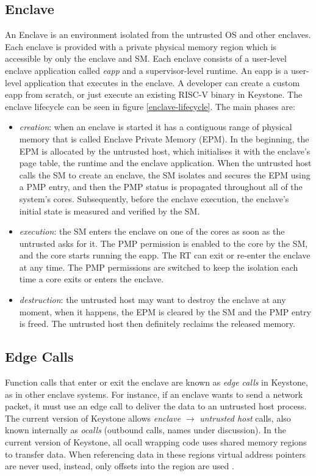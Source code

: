 \subsection{Enclave}
An Enclave is an environment isolated from the untrusted OS and other enclaves. Each enclave is provided with a private physical memory region which is accessible by only the enclave and SM. Each enclave consists of a user-level enclave application called \textit{eapp} and a supervisor-level runtime. An eapp is a user-level application that executes in the enclave. A developer can create a custom eapp from scratch, or just execute an existing RISC-V binary in Keystone. The enclave lifecycle can be seen in figure \ref{enclave-lifecycle}. The main phases are:
\begin{itemize}
    \item \textit{creation}: when an enclave is started it has a contiguous range of physical memory that is called Enclave Private Memory (EPM). In the beginning, the EPM is allocated by the untrusted host, which initialises it with the enclave's page table, the runtime and the enclave application. When the untrusted host calls the SM to create an enclave, the SM isolates and secures the EPM using a PMP entry, and then the PMP status is propagated throughout all of the system's cores. Subsequently, before the enclave execution, the enclave's initial state is measured and verified by the SM.
    \item \textit{execution}: the SM enters the enclave on one of the cores as soon as the untrusted asks for it. The PMP permission is enabled to the core by the SM, and the core starts running the eapp. The RT can exit or re-enter the enclave at any time. The PMP permissions are switched to keep the isolation each time a core exits or enters the enclave.
    \item \textit{destruction}: the untrusted host may want to destroy the enclave at any moment, when it happens, the EPM is cleared by the SM and the PMP entry is freed. The untrusted host then definitely reclaims the released memory.
\end{itemize}

\subsection{Edge Calls}
Function calls that enter or exit the enclave are known as \textit{edge calls} in Keystone, as in other enclave systems. For instance, if an enclave wants to send a network packet, it must use an edge call to deliver the data to an untrusted host process. The current version of Keystone allows \textit{enclave} $\rightarrow$ \textit{untrusted host} calls, also known internally as \textit{ocalls} (outbound calls, names under discussion). In the current version of Keystone, all ocall wrapping code uses shared memory regions to transfer data. When referencing data in these regions virtual address pointers are never used, instead, only offsets into the region are used \cite{keystone-doc}. \\
 

